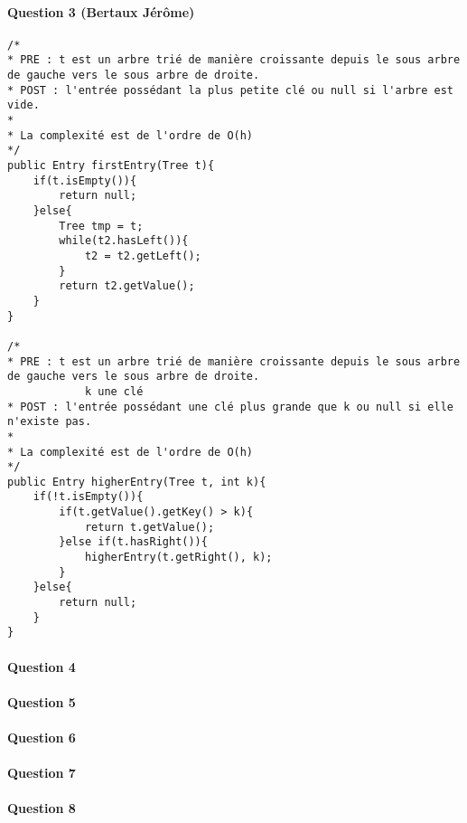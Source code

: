 \documentclass[a4paper]{article}
\begin{document}
\paragraph*{Question 3 (Bertaux Jérôme)}
\begin{verbatim}
/*
* PRE : t est un arbre trié de manière croissante depuis le sous arbre de gauche vers le sous arbre de droite.
* POST : l'entrée possédant la plus petite clé ou null si l'arbre est vide.
* 
* La complexité est de l'ordre de O(h)
*/
public Entry firstEntry(Tree t){
	if(t.isEmpty()){
		return null;
	}else{
		Tree tmp = t;
		while(t2.hasLeft()){
			t2 = t2.getLeft();		
		}
		return t2.getValue();	
	}
}

/*
* PRE : t est un arbre trié de manière croissante depuis le sous arbre de gauche vers le sous arbre de droite.
			k une clé
* POST : l'entrée possédant une clé plus grande que k ou null si elle n'existe pas.
* 
* La complexité est de l'ordre de O(h)
*/
public Entry higherEntry(Tree t, int k){
	if(!t.isEmpty()){
		if(t.getValue().getKey() > k){
			return t.getValue();		
		}else if(t.hasRight()){
			higherEntry(t.getRight(), k);		
		}	
	}else{
		return null;	
	}
}
\end{verbatim}

\paragraph*{Question 4}
\paragraph*{Question 5}
\paragraph*{Question 6}
\paragraph*{Question 7}
\paragraph*{Question 8}
\end{document}
